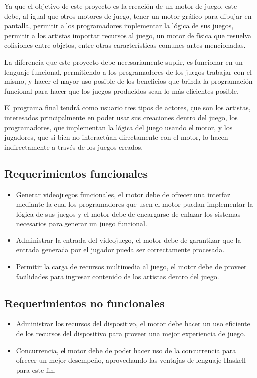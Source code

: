 Ya que el objetivo de este proyecto es la creación de un motor de juego, este debe, al igual que otros motores de juego, tener un motor gráfico para dibujar en pantalla, permitir a los programadores implementar la lógica de sus juegos, permitir a los artistas importar recursos al juego, un motor de física que resuelva colisiones entre objetos, entre otras características comunes antes mencionadas.

La diferencia que este proyecto debe necesariamente suplir, es funcionar en un lenguaje funcional, permitiendo a los programadores de los juegos trabajar con el mismo, y hacer el mayor uso posible de los beneficios que brinda la programación funcional para hacer que los juegos producidos sean lo más eficientes posible.

El programa final tendrá como usuario tres tipos de actores, que son los artistas, interesados principalmente en poder usar sus creaciones dentro del juego, los programadores, que implementan la lógica del juego usando el motor, y los jugadores, que si bien no interactúan directamente con el motor, lo hacen indirectamente a través de los juegos creados.

\subsection{Requerimientos funcionales}

\begin{itemize}
  \item Generar videojuegos funcionales, el motor debe de ofrecer una interfaz mediante la cual los programadores que usen el motor puedan implementar la lógica de sus juegos y el motor debe de encargarse de enlazar los sistemas necesarios para generar un juego funcional.
  \item Administrar la entrada del videojuego, el motor debe de garantizar que la entrada generada por el jugador pueda ser correctamente procesada.
  \item Permitir la carga de recursos multimedia al juego, el motor debe de proveer facilidades para ingresar contenido de los artistas dentro del juego.
\end{itemize}

\subsection{Requerimientos no funcionales}

\begin{itemize}
  \item Administrar los recursos del dispositivo, el motor debe hacer un uso eficiente de los recursos del dispositivo para proveer una mejor experiencia de juego.
  \item Concurrencia, el motor debe de poder hacer uso de la concurrencia para ofrecer un mejor desempeño, aprovechando las ventajas de lenguaje Haskell para este fin.
\end{itemize}

